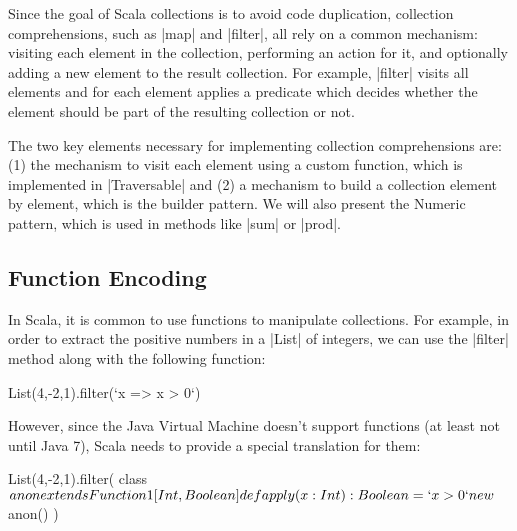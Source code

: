 
Since the goal of Scala collections is to avoid code duplication, collection comprehensions, such as |map| and |filter|, all rely on a common mechanism: visiting each element in the collection, performing an action for it, and optionally adding a new element to the result collection. For example, |filter| visits all elements and for each element applies a predicate which decides whether the element should be part of the resulting collection or not.

The two key elements necessary for implementing collection comprehensions are: (1) the mechanism to visit each element using a custom function, which is implemented in |Traversable| and (2) a mechanism to build a collection element by element, which is the builder pattern. We will also present the Numeric pattern, which is used in methods like |sum| or |prod|.

\subsection{Function Encoding}

In Scala, it is common to use functions to manipulate collections. For example, in order to extract the positive numbers in a |List| of integers, we can use the |filter| method along with the following function:

\begin{lstlisting-nobreak}
 List(4,-2,1).filter(`x => x > 0`)
\end{lstlisting-nobreak}

However, since the Java Virtual Machine doesn't support functions (at least not until Java 7), Scala needs to provide a special translation for them:

\begin{lstlisting-nobreak}
 List(4,-2,1).filter({
     class $anon extends Function1[Int, Boolean] {
       def apply(x: Int): Boolean = `x > 0`
     }
     new $anon()
   })
\end{lstlisting-nobreak}


